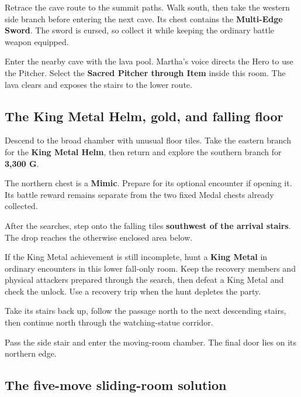 Retrace the cave route to the summit paths. Walk south,
then take the western side branch before entering the
next cave. Its chest contains the \textbf{Multi-Edge Sword}.
The sword is cursed, so collect it while keeping the ordinary
battle weapon equipped.

Enter the nearby cave with the lava pool. Martha's voice
directs the Hero to use the Pitcher. Select the
\textbf{Sacred Pitcher through Item} inside this room.
The lava clears and exposes the stairs to the lower route.

\subsection*{The King Metal Helm, gold, and falling floor}

Descend to the broad chamber with unusual floor tiles.
Take the eastern branch for the \textbf{King Metal Helm},
then return and explore the southern branch for
\textbf{3,300 G}.

The northern chest is a \textbf{Mimic}. Prepare for its
optional encounter if opening it. Its battle reward remains
separate from the two fixed Medal chests already collected.

After the searches, step onto the falling tiles
\textbf{southwest of the arrival stairs}. The drop reaches
the otherwise enclosed area below.

If the King Metal achievement is still incomplete, hunt a
\textbf{King Metal} in ordinary encounters in this lower fall-only
room. Keep the recovery members and physical attackers prepared
through the search, then defeat a King Metal and check the unlock.
Use a recovery trip when the hunt depletes the party.


Take its stairs back up, follow the passage north to the next descending stairs,
then continue north through the watching-statue corridor.

Pass the side stair and enter the moving-room chamber.
The final door lies on its northern edge.

\subsection*{The five-move sliding-room solution}

